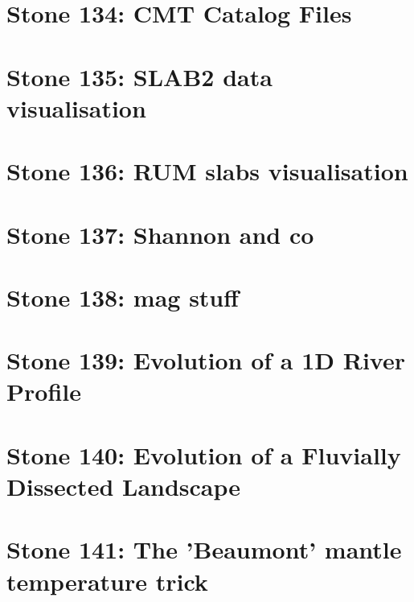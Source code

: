 \documentclass[a4paper,11pt]{report}
\begin{document}
\chapter{Stone 134: CMT Catalog Files\label{f134}}

\chapter{Stone 135: SLAB2 data visualisation\label{f135}}

\chapter{Stone 136: RUM slabs visualisation\label{f136}}

\chapter{Stone 137: Shannon and co \label{f137}}

\chapter{Stone 138: mag stuff \label{f138}}

\chapter{Stone 139: Evolution of a 1D River Profile\label{f139}}

\chapter{Stone 140: Evolution of a Fluvially Dissected Landscape \label{f140}}

\chapter{Stone 141: The 'Beaumont' mantle temperature trick \label{f141}}



\printbibliography
\end{document}
